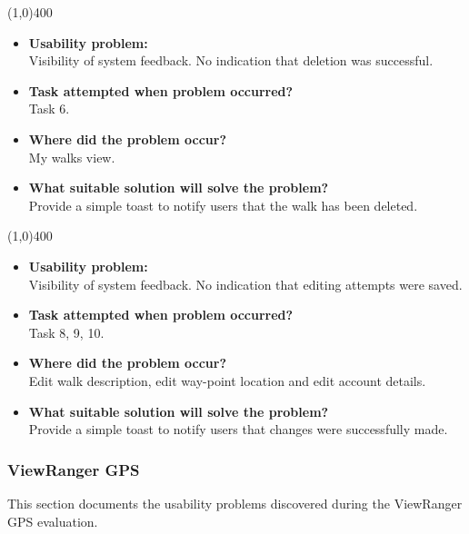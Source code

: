 \documentclass[11pt,a4paper]{article}
\begin{document}
\line(1,0){400}

\begin{itemize}
	\item\textbf{Usability problem:}\\
	Visibility of system feedback. No indication that deletion was successful.

	\item\textbf{Task attempted when problem occurred?}\\
	Task 6.

	\item\textbf{Where did the problem occur?}\\
	My walks view.

	\item\textbf{What suitable solution will solve the problem?}\\
	Provide a simple toast to notify users that the walk has been deleted.
\end{itemize}

\line(1,0){400}

\begin{itemize}
	\item\textbf{Usability problem:}\\
	Visibility of system feedback. No indication that editing attempts were saved.

	\item\textbf{Task attempted when problem occurred?}\\
	Task 8, 9, 10.

	\item\textbf{Where did the problem occur?}\\
	Edit walk description, edit way-point location and edit account details.

	\item\textbf{What suitable solution will solve the problem?}\\
	Provide a simple toast to notify users that changes were successfully made.
\end{itemize}

\subsubsection{ViewRanger GPS}

This section documents the usability problems discovered during the ViewRanger GPS evaluation.
\end{document}

